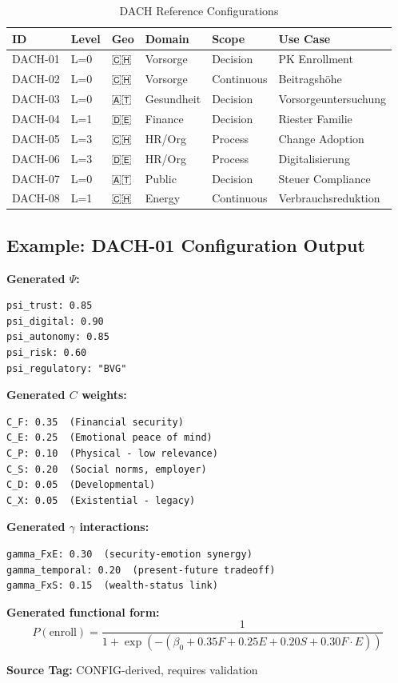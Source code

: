 \begin{table}[htbp]
\centering
\caption{DACH Reference Configurations}
\label{tab:ggg-dach-configs}
\renewcommand{\arraystretch}{1.3}
\small
\begin{tabular}{@{}llllll@{}}
\toprule
\textbf{ID} & \textbf{Level} & \textbf{Geo} & \textbf{Domain} & \textbf{Scope} & \textbf{Use Case} \\
\midrule
DACH-01 & L=0 & 🇨🇭 & Vorsorge & Decision & PK Enrollment \\
DACH-02 & L=0 & 🇨🇭 & Vorsorge & Continuous & Beitragshöhe \\
DACH-03 & L=0 & 🇦🇹 & Gesundheit & Decision & Vorsorgeuntersuchung \\
DACH-04 & L=1 & 🇩🇪 & Finance & Decision & Riester Familie \\
DACH-05 & L=3 & 🇨🇭 & HR/Org & Process & Change Adoption \\
DACH-06 & L=3 & 🇩🇪 & HR/Org & Process & Digitalisierung \\
DACH-07 & L=0 & 🇦🇹 & Public & Decision & Steuer Compliance \\
DACH-08 & L=1 & 🇨🇭 & Energy & Continuous & Verbrauchsreduktion \\
\bottomrule
\end{tabular}
\end{table}

\subsection{Example: DACH-01 Configuration Output}

\begin{tcolorbox}[colback=white, colframe=black,
    title=DACH-01: PK Enrollment Switzerland (L=0, CH, Vorsorge, Decision)]
\textbf{Generated $\Psi$:}
\begin{verbatim}
psi_trust: 0.85
psi_digital: 0.90
psi_autonomy: 0.85
psi_risk: 0.60
psi_regulatory: "BVG"
\end{verbatim}

\textbf{Generated $C$ weights:}
\begin{verbatim}
C_F: 0.35  (Financial security)
C_E: 0.25  (Emotional peace of mind)
C_P: 0.10  (Physical - low relevance)
C_S: 0.20  (Social norms, employer)
C_D: 0.05  (Developmental)
C_X: 0.05  (Existential - legacy)
\end{verbatim}

\textbf{Generated $\gamma$ interactions:}
\begin{verbatim}
gamma_FxE: 0.30  (security-emotion synergy)
gamma_temporal: 0.20  (present-future tradeoff)
gamma_FxS: 0.15  (wealth-status link)
\end{verbatim}

\textbf{Generated functional form:}
\begin{equation}
P(\text{enroll}) = \frac{1}{1+\exp(-(\beta_0 + 0.35 F + 0.25 E + 0.20 S + 0.30 F \cdot E))}
\end{equation}

\textbf{Source Tag:} CONFIG-derived, requires validation
\end{tcolorbox}


